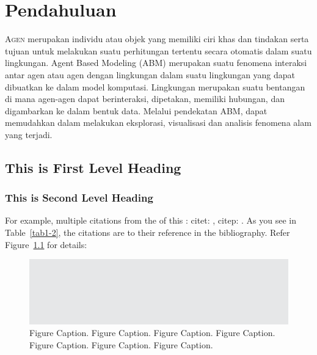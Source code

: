 \chapter{Pendahuluan}

\maketitle%

\lettrine[loversize=1,lraise=0.3,lines=2]{A}{gen} merupakan individu atau objek yang memiliki ciri khas dan tindakan serta tujuan untuk melakukan suatu perhitungan tertentu secara otomatis dalam suatu lingkungan. Agent Based Modeling (ABM) merupakan suatu fenomena interaksi antar agen atau agen dengan lingkungan dalam suatu lingkungan yang dapat dibuatkan ke dalam model komputasi. Lingkungan merupakan suatu bentangan di mana agen-agen dapat berinteraksi, dipetakan, memiliki hubungan, dan digambarkan ke dalam bentuk data. Melalui pendekatan ABM, dapat memudahkan dalam melakukan eksplorasi, visualisasi dan analisis fenomena alam yang terjadi.

\section{This is First Level Heading}

\lipsum[1-2]

\subsection{This is Second Level Heading}

\lipsum[3]

For example, multiple citations from the  of this :
citet: \citet{CR7,CR8}, citep: \citep{CR9,CR6}.
As you see in Table~\ref{tab1-2}, the citations are  to their
reference in the bibliography. Refer Figure~\ref{fig1-1} for details:

\begin{figure}
\includegraphics{01.eps}
\caption{Figure Caption. Figure Caption.
Figure Caption. Figure Caption. Figure Caption. 
Figure Caption. Figure Caption.
\label{fig1-1}}
\end{figure}

